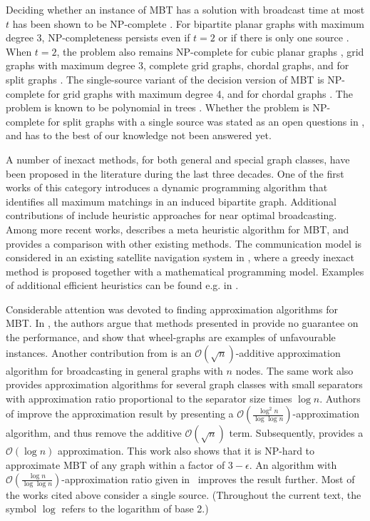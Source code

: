 Deciding whether an instance of MBT has a solution with broadcast time at most $t$ has been shown to be NP-complete \cite{slater81}. 
For bipartite planar graphs with maximum degree 3, NP-completeness persists even if $t=2$ or if there is only one source \cite{jansen95}.
When $t=2$, the problem also remains NP-complete for cubic planar graphs \cite{middendorf93}, grid graphs with maximum degree 3,
complete grid graphs, chordal graphs, and for split graphs \cite{jansen95}. 
The single-source variant of the decision version of MBT is NP-complete for grid graphs with maximum degree 4, and for chordal graphs \cite{jansen95}.
The problem is known to be polynomial in trees \cite{slater81}.
Whether the problem is NP-complete for split graphs with a single source was stated as an open questions in \cite{jansen95}, and has to the best of our knowledge not been answered yet.

A number of inexact methods, for both general and special graph classes, have been proposed in the literature during the last three decades.
One of the first works of this category \cite{scheuermann84} 
introduces a dynamic programming algorithm that identifies all maximum matchings in an induced bipartite graph.
Additional contributions of \cite{scheuermann84} include heuristic approaches for near optimal broadcasting.
Among more recent works, \cite{hasson04} describes a meta heuristic algorithm for MBT, and provides a comparison with other existing methods.
The communication model is considered in an existing satellite navigation system in \cite{chu17}, where a greedy inexact method is proposed together with a mathematical programming model.
Examples of additional efficient heuristics can be found e.g. in \cite{harutyunyan06,harutyunyan14,wang10}.

Considerable attention was devoted to finding approximation algorithms for MBT. 
In \cite{kortsarz95}, the authors argue that methods presented in \cite{scheuermann84} provide no guarantee on the performance, 
and show that wheel-graphs are examples of unfavourable instances.
Another contribution from \cite{kortsarz95} is an $\mathcal{O}(\sqrt{n})$-additive approximation algorithm for broadcasting in general graphs with $n$ nodes.
The same work also provides approximation algorithms for several graph classes with small separators with approximation ratio proportional to the separator size times $\log n$.
Authors of \cite{ravi94} improve the approximation result by presenting a 
$\mathcal{O}\left(\frac{\log^2 n}{\log \log n}\right)$-approximation  algorithm, and thus remove the additive $\mathcal{O}(\sqrt{n})$ term.
Subsequently, \cite{barnoy00} provides a $\mathcal{O}(\log n)$ approximation.
This work also shows that it is NP-hard to approximate MBT of any graph within a factor of $3-\epsilon$.
An algorithm with $\mathcal{O}\left(\frac{\log n}{\log \log n}\right)$-approximation ratio given in~\cite{elkin03} improves the result further.
Most of the works cited above consider a single source.
(Throughout the current text, the symbol $\log$ refers to the logarithm of base 2.)

